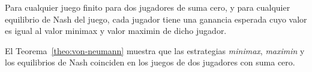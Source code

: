 \begin{theorem}
\label{theo:von-neumann}
Para cualquier juego finito para dos jugadores de suma cero, y para cualquier equilibrio de Nash del juego, cada jugador tiene una ganancia esperada cuyo valor es igual al valor minimax y valor maximin de dicho jugador. \end{theorem}

El Teorema~\ref{theo:von-neumann} muestra que las estrategias \textit{minimax}, \textit{maximin} y los equilibrios de Nash coinciden en los juegos de dos jugadores con suma cero.